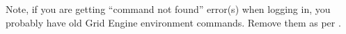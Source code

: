



%

Note, if you are getting ``command not found'' error(s) when logging in, you
probably have old Grid Engine environment commands. Remove them
as per .
